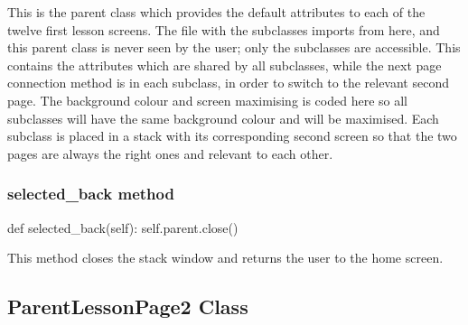 This is the parent class which provides the default attributes to each of the twelve first lesson screens. The file with the subclasses imports from here, and this parent class is never seen by the user; only the subclasses are accessible. This contains the attributes which are shared by all subclasses, while the next page connection method is in each subclass, in order to switch to the relevant second page. The background colour and screen maximising is coded here so all subclasses will have the same background colour and will be maximised. Each subclass is placed in a stack with its corresponding second screen so that the two pages are always the right ones and relevant to each other.

\subsubsection{selected\_back method}

\begin{python}
def selected_back(self):
        self.parent.close()
\end{python}

This method closes the stack window and returns the user to the home screen.

\subsection{ParentLessonPage2 Class}

